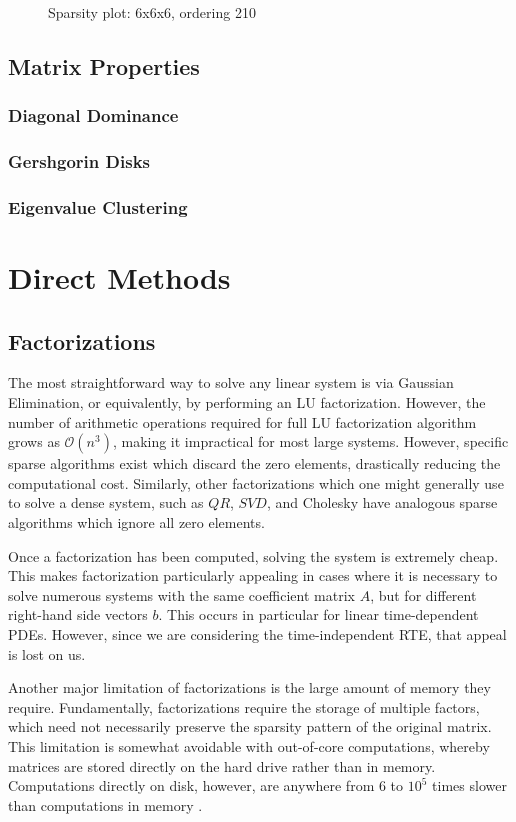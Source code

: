 \documentclass[10pt]{article}
\begin{document}
\begin{multicols}{2}
\begin{center}
\begin{minipage}[t]{.5\textwidth}
\begin{figure}[H]
	\caption{Sparsity plot: 6x6x6, ordering 210 }
\end{figure}
\end{minipage}%
\end{center}
\pagebreak

\subsection{Matrix Properties}

\subsubsection{Diagonal Dominance}
\subsubsection{Gershgorin Disks}
\subsubsection{Eigenvalue Clustering}

\section{Direct Methods}
\subsection{Factorizations}
The most straightforward way to solve any linear system is via Gaussian Elimination, or equivalently, by performing an LU factorization.
However, the number of arithmetic operations required for full LU factorization algorithm grows as $\mathcal{O}(n^3)$, making it impractical for most large systems.
However, specific sparse algorithms exist which discard the zero elements, drastically reducing the computational cost.
Similarly, other factorizations which one might generally use to solve a dense system, such as $QR$, $SVD$, and Cholesky have analogous sparse algorithms which ignore all zero elements.

Once a factorization has been computed, solving the system is extremely cheap.
This makes factorization particularly appealing in cases where it is necessary to solve numerous systems with the same coefficient matrix $A$, but for different right-hand side vectors $b$.
This occurs in particular for linear time-dependent PDEs.
However, since we are considering the time-independent RTE, that appeal is lost on us.

Another major limitation of factorizations is the large amount of memory they require.
Fundamentally, factorizations require the storage of multiple factors, which need not necessarily preserve the sparsity pattern of the original matrix.
This limitation is somewhat avoidable with out-of-core computations, whereby matrices are stored directly on the hard drive rather than in memory.
Computations directly on disk, however, are anywhere from 6 to $10^5$ times slower than computations in memory \citep{jacobs_pathologies_2009}.

\end{multicols}
\end{document}
